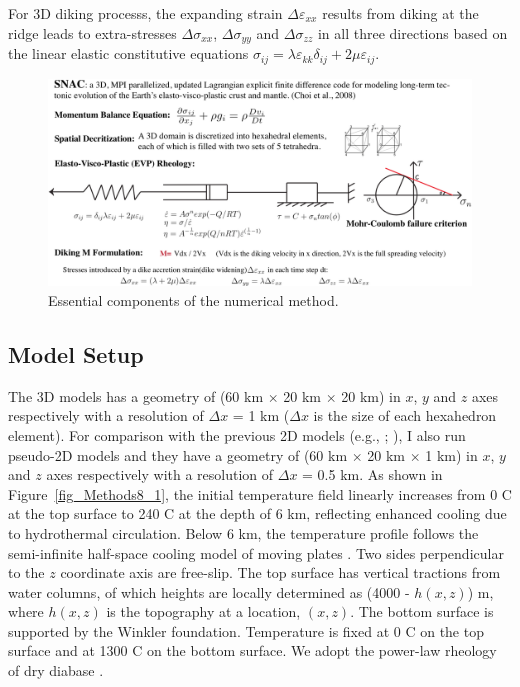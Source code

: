 For 3D diking processs, the expanding strain $\Delta\varepsilon_{xx}$ results from diking at the ridge leads to extra-stresses $\Delta\sigma_{xx}$, $\Delta\sigma_{yy}$ and $\Delta\sigma_{zz}$ in all three directions based on the linear elastic constitutive equations $\sigma_{ij}=\lambda\varepsilon_{kk}\delta_{ij}+2\mu\varepsilon_{ij}$.

\begin{figure}[H]
 \centering
  \includegraphics[width=1.0\textwidth]{./Figures/fig_Methods7_3.png}
 \caption{\small{Essential components of the numerical method.}}
 \label{fig_Methods7_3}
\end{figure}

\subsection{Model Setup}
The 3D models has a geometry of (60 km $\times$ 20 km $\times$ 20 km) in $x$, $y$ and $z$ axes respectively with a resolution of $\Delta x$ = 1 km ($\Delta x$ is the size of each hexahedron element). For comparison with the previous 2D models (e.g., \citealp{Buck2005}; \citealp{Tucholke2008}), I also run pseudo-2D models and they have a geometry of (60 km $\times$ 20 km $\times$ 1 km) in $x$, $y$ and $z$ axes respectively with a resolution of $\Delta x$ = 0.5 km. As shown in Figure~\ref{fig_Methods8_1}, the initial temperature field linearly increases from 0 \degree C at the top surface to 240 \degree C at the depth of 6 km, reflecting enhanced cooling due to hydrothermal circulation. Below 6 km, the temperature profile follows the semi-infinite half-space cooling model of moving plates \citep[e.g.,][]{Turcotte2002}. Two sides perpendicular to the $z$ coordinate axis are free-slip. The top surface has vertical tractions from water columns, of which heights are locally determined as (4000 - $h(x,z)$) m, where $h(x,z)$ is the topography at a location, $(x,z)$. The bottom surface is supported by the Winkler foundation. Temperature is fixed at 0 \degree C on the top surface and at 1300 \degree C on the bottom surface. We adopt the power-law rheology of dry diabase \citep[e.g.,][]{Kirby1987, Buck2005}. 

